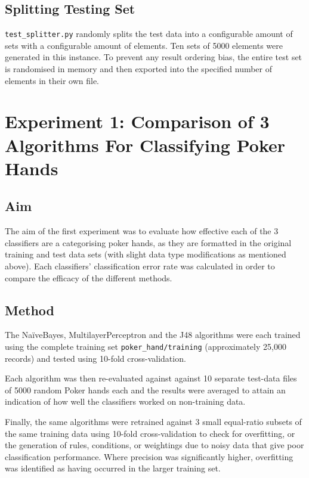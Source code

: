 \documentclass[10pt, a4paper]{article}
\begin{document}
\subsection*{Splitting Testing Set}

\texttt{test\_splitter.py} randomly splits the test data into a configurable amount of sets with a configurable amount of elements. Ten sets of 5000 elements were generated in this instance. To prevent any result ordering bias, the entire test set is randomised in memory and then exported into the specified number of elements in their own file.

\section*{Experiment 1: Comparison of 3 Algorithms For Classifying Poker Hands}

\subsection*{Aim}

The aim of the first experiment was to evaluate how effective each of the 3 classifiers are a categorising poker hands, as they are formatted in the original training and test data sets (with slight data type modifications as mentioned above). Each classifiers' classification error rate was calculated in order to compare the efficacy of the different methods.

\subsection*{Method}

The Na\"iveBayes, MultilayerPerceptron and the J48 algorithms were each trained using the complete training set \texttt{poker\_hand/training} (approximately 25,000 records) and tested using 10-fold cross-validation.

Each algorithm was then re-evaluated against against 10 separate test-data files of 5000 random Poker hands each and the results were averaged to attain an indication of how well the classifiers worked on non-training data.

Finally, the same algorithms were retrained against 3 small equal-ratio subsets of the same training data using 10-fold cross-validation to check for overfitting, or the generation of rules, conditions, or weightings due to noisy data that give poor classification performance. Where precision was significantly higher, overfitting was identified as having occurred in the larger training set.
\end{document}
